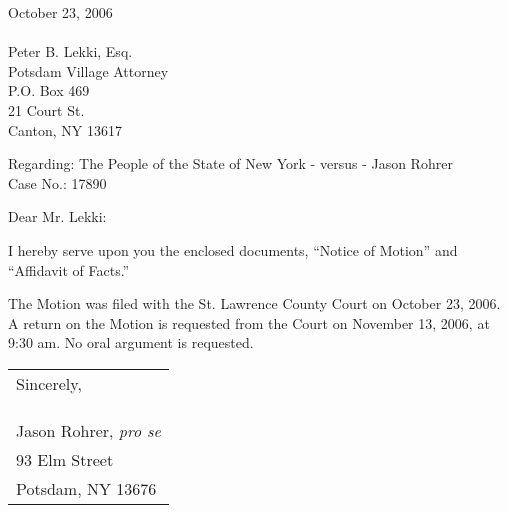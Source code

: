 \documentclass[12pt]{article}
\begin{document}
October 23, 2006\\
\\
Peter B. Lekki, Esq.\\
Potsdam Village Attorney\\
P.O. Box 469\\
21 Court St.\\
Canton, NY 13617

\vspace{0.5in}


Regarding: The People of the State of New York - versus - Jason Rohrer\\
Case No.: 17890

\vspace{0.5in}

Dear Mr. Lekki:

\vspace{0.25in}

I hereby serve upon you the enclosed documents, ``Notice of Motion'' and ``Affidavit of Facts.''

The Motion was filed with the St. Lawrence County Court on October 23, 2006.  A return on the Motion is requested from the Court on November 13, 2006, at 9:30 am.  No oral argument is requested.


\begin{flushright}
\begin{tabular}{l}
Sincerely,\\
\\
\\
\hline
\\
Jason Rohrer, {\em pro se}\\
93 Elm Street\\
Potsdam, NY 13676
\end{tabular}
\end{flushright}
\end{document}
